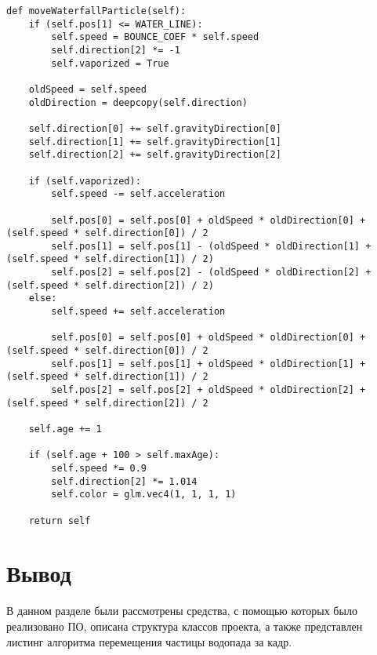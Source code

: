 \begin{center}
    \captionsetup{justification=raggedright,singlelinecheck=off}
    \begin{lstlisting}[label=lst:particle_move,caption=Алгоритм перемещения частицы водопада за один кадр]
def moveWaterfallParticle(self):
    if (self.pos[1] <= WATER_LINE):
        self.speed = BOUNCE_COEF * self.speed
        self.direction[2] *= -1
        self.vaporized = True

    oldSpeed = self.speed
    oldDirection = deepcopy(self.direction)

    self.direction[0] += self.gravityDirection[0]
    self.direction[1] += self.gravityDirection[1]
    self.direction[2] += self.gravityDirection[2]

    if (self.vaporized):
        self.speed -= self.acceleration

        self.pos[0] = self.pos[0] + oldSpeed * oldDirection[0] + (self.speed * self.direction[0]) / 2 
        self.pos[1] = self.pos[1] - (oldSpeed * oldDirection[1] + (self.speed * self.direction[1]) / 2)
        self.pos[2] = self.pos[2] - (oldSpeed * oldDirection[2] + (self.speed * self.direction[2]) / 2)
    else:
        self.speed += self.acceleration

        self.pos[0] = self.pos[0] + oldSpeed * oldDirection[0] + (self.speed * self.direction[0]) / 2
        self.pos[1] = self.pos[1] + oldSpeed * oldDirection[1] + (self.speed * self.direction[1]) / 2
        self.pos[2] = self.pos[2] + oldSpeed * oldDirection[2] + (self.speed * self.direction[2]) / 2

    self.age += 1

    if (self.age + 100 > self.maxAge):
        self.speed *= 0.9
        self.direction[2] *= 1.014
        self.color = glm.vec4(1, 1, 1, 1)

    return self
\end{lstlisting}
\end{center}


\section*{Вывод}

В данном разделе были рассмотрены средства, с помощью которых было реализовано ПО, описана структура классов проекта, а также представлен листинг алгоритма перемещения частицы водопада за кадр.
